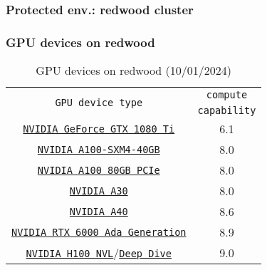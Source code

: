 \subsubsection{Protected env.: redwood cluster}
\begin{frame}
	\frametitle{GPU devices on redwood}	
\begin{table}[H]
   \begin{center}
     \begin{tabular}{c|c}
       \multirow{2}{*}{\texttt{GPU device type}} & \texttt{compute} \\
	                                               & \texttt{capability} \\
       \hline
       \href{https://www.nvidia.com/en-us/geforce/10-series/\#1080-ti-spec}{\small{\texttt{NVIDIA GeForce GTX 1080 Ti}}}    &  \small{6.1}  \\
       \href{https://www.nvidia.com/content/dam/en-zz/Solutions/Data-Center/a100/pdf/nvidia-a100-datasheet-us-nvidia-1758950-r4-web.pdf}{\small{\texttt{NVIDIA A100-SXM4-40GB}}} &  \small{8.0} \\
	     \href{https://www.nvidia.com/content/dam/en-zz/Solutions/Data-Center/a100/pdf/nvidia-a100-datasheet-us-nvidia-1758950-r4-web.pdf}{\small{\texttt{NVIDIA A100 80GB PCIe}}} &  \small{8.0} \\
	     \href{https://www.nvidia.com/content/dam/en-zz/Solutions/data-center/products/a30-gpu/pdf/a30-datasheet.pdf}{\small{\texttt{NVIDIA A30}}}   &  \small{8.0} \\
	     \href{https://images.nvidia.com/content/Solutions/data-center/a40/nvidia-a40-datasheet.pdf}{\small{\texttt{NVIDIA A40}}} &  \small{8.6} \\
	     \href{https://www.nvidia.com/content/dam/en-zz/Solutions/design-visualization/rtx-6000/proviz-print-rtx6000-datasheet-web-2504660.pdf}{\small{\texttt{NVIDIA RTX 6000 Ada Generation}}}&  \small{8.9} \\
	     \href{https://www.nvidia.com/en-us/data-center/h100/}{\texttt{NVIDIA H100 NVL}}/\href{https://www.nvidia.com/content/dam/en-zz/Solutions/Data-Center/h100/PB-11773-001\_v01.pdf}{\small{\texttt{Deep Dive}}} &  \small{9.0} \\
        \hline
     \end{tabular}
   \end{center}	   
   \caption{GPU devices on redwood (10/01/2024)}
\end{table}	   
\end{frame}

